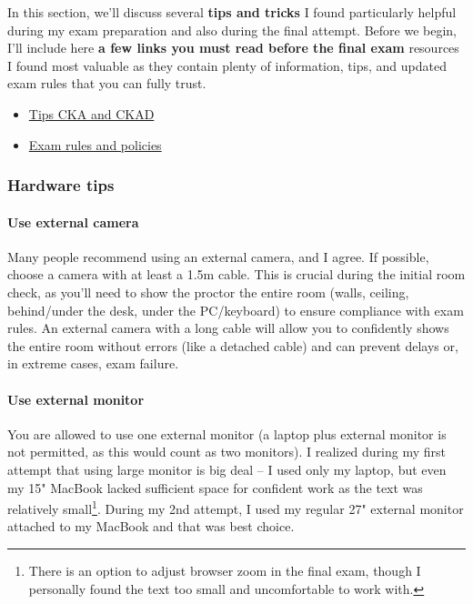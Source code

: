 In this section, we'll discuss several \textbf{tips and tricks} I found particularly helpful during my exam preparation and also during the final attempt. Before we begin, I'll include here \textbf{a few links you must read before the final exam} resources I found most valuable as they contain plenty of information, tips, and updated exam rules that you can fully trust.

\begin{itemize}
	\item \href{https://docs.linuxfoundation.org/tc-docs/certification/tips-cka-and-ckad}{Tips CKA and CKAD}
	\item \href{https://docs.linuxfoundation.org/tc-docs/certification/lf-handbook2/exam-rules-and-policies}{Exam rules and policies}
\end{itemize}

\subsubsection{Hardware tips}

\paragraph{Use external camera} Many people recommend using an external camera, and I agree. If possible, choose a camera with at least a 1.5m cable. This is crucial during the initial room check, as you'll need to show the proctor the entire room (walls, ceiling, behind/under the desk, under the PC/keyboard) to ensure compliance with exam rules\cite{linuxfoundation-exam-rules}\cite{linuxfoundation-important-instructions-cka-and-ckad}. An external camera with a long cable will allow you to confidently shows the entire room without errors (like a detached cable) and can prevent delays or, in extreme cases, exam failure.

\paragraph{Use external monitor} You are allowed to use one external monitor (a laptop plus external monitor is not permitted, as this would count as two monitors). I realized during my first attempt  that using large monitor is big deal -- I used only my laptop, but even my 15" MacBook lacked sufficient space for confident work as the text was relatively small\footnote{There is an option to adjust browser zoom in the final exam, though I personally found the text too small and uncomfortable to work with.}. During my 2nd attempt, I used my regular 27" external monitor attached to my MacBook and that was best choice.

